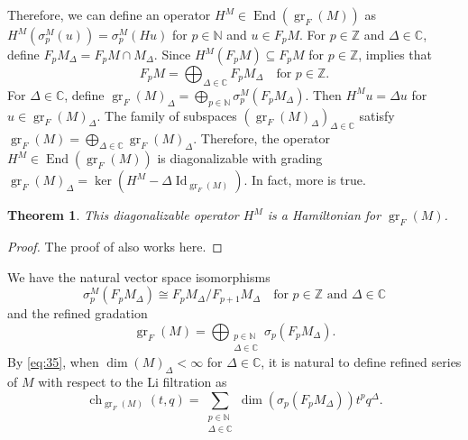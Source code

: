 \documentclass[a4paper, 12pt, reqno]{amsart}
\newtheorem{theorem}{Theorem}[section]
\theoremstyle{remark}
\numberwithin{equation}{subsection}
\DeclareMathOperator{\Id}{Id}
\DeclareMathOperator{\gr}{gr}
\DeclareMathOperator{\End}{End}
\DeclareMathOperator{\ch}{ch}
\begin{document}
Therefore, we can define an operator $H^M \in \End(\gr_F(M))$ as $H^M(\sigma^M_p(u)) = \sigma^M_p(Hu)$ for $p \in \mathbb{N}$ and $u \in F_pM$.
For $p \in \mathbb{Z}$ and $\Delta \in \mathbb{C}$, define $F_pM_{\Delta} = F_pM \cap M_{\Delta}$.
Since $H^M(F_pM) \subseteq F_pM$ for $p \in \mathbb{Z}$,  implies that
\begin{equation*}
  F_pM = \bigoplus_{\Delta \in \mathbb{C}}F_pM_{\Delta} \quad \text{for }p \in \mathbb{Z}.
\end{equation*}
For $\Delta \in \mathbb{C}$, define $\gr_F(M)_{\Delta} = \bigoplus_{p \in \mathbb{N}}\sigma^M_p(F_pM_{\Delta})$.
Then $H^Mu = \Delta u$ for $u \in \gr_F(M)_{\Delta}$.
The family of subspaces $(\gr_F(M)_{\Delta})_{\Delta \in \mathbb{C}}$ satisfy $\gr_F(M) = \bigoplus_{\Delta \in \mathbb{C}}\gr_F(M)_{\Delta}$.
Therefore, the operator $H^M \in \End(\gr_F(M))$ is diagonalizable with grading $\gr_F(M)_{\Delta} = \ker(H^M - \Delta\Id_{\gr_F(M)})$.
In fact, more is true.

\begin{theorem}
  \label{thr:46}
  This diagonalizable operator $H^M$ is a Hamiltonian for $\gr_F(M)$.
\end{theorem}

\begin{proof}
  The proof of  also works here.
\end{proof}

We have the natural vector space isomorphisms
\begin{equation*}
  \sigma^M_p(F_pM_{\Delta}) \cong F_pM_{\Delta}/F_{p + 1}M_{\Delta} \quad \text{for }p \in \mathbb{Z}\text{ and }\Delta \in \mathbb{C}
\end{equation*}
and the refined gradation
\begin{equation}
  \label{eq:35}
  \gr_F(M) =\bigoplus_{\substack{p \in \mathbb{N} \\ \Delta \in \mathbb{C}}}\sigma_p(F_pM_{\Delta}).
\end{equation}
By \eqref{eq:35}, when $\dim(M)_{\Delta} < \infty$ for $\Delta \in \mathbb{C}$, it is natural to define refined series of $M$ with respect to the Li filtration as
\begin{equation*}
  \ch_{\gr_F(M)}(t, q) = \sum_{\substack{p \in \mathbb{N} \\ \Delta \in \mathbb{C}}}\dim(\sigma_p(F_pM_{\Delta}))t^pq^{\Delta}.
\end{equation*}
\end{document}
